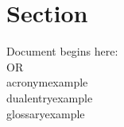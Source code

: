 \documentclass[../main.tex]{subfiles}
\begin{document}
	\section{Section}
		Document begins here:       \\
		\cite[cite]{Bibtex2021} OR\cite{Bibtex2021}\\
		\gls{acronymexample}\\
		\gls{dualentryexample}\\
		\gls{glossaryexample}\\
		
\end{document}
